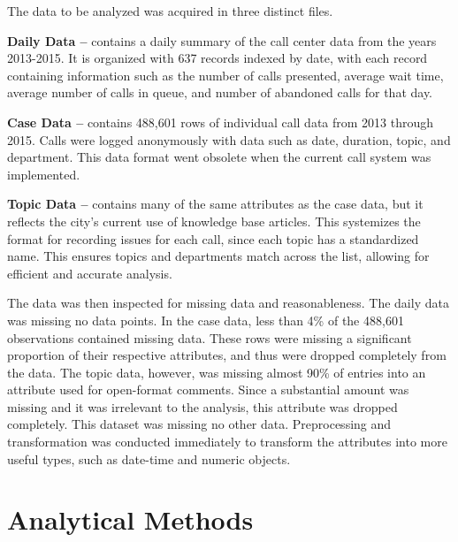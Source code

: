 \documentclass{article}
\begin{document}
The data to be analyzed was acquired in three distinct files.
\par
\textbf{Daily Data --} contains a daily summary of the call center data from the years 2013-2015.  It is organized with 637 records indexed by date, with each record containing information such as the number of calls presented, average wait time, average number of calls in queue, and number of abandoned calls for that day.
\par
\textbf{Case Data --} contains 488,601 rows of individual call data from 2013 through 2015.  Calls were logged anonymously with data such as date, duration, topic, and department.  This data format went obsolete when the current call system was implemented.
\par
\textbf{Topic Data --} contains many of the same attributes as the case data, but it reflects the city's current use of knowledge base articles.  This systemizes the format for recording issues for each call, since each topic has a standardized name.  This ensures topics and departments match across the list, allowing for efficient and accurate analysis.
\par
The data was then inspected for missing data and reasonableness.  The daily data was missing no data points.  In the case data, less than 4\% of the 488,601 observations contained missing data.  These rows were missing a significant proportion of their respective attributes, and thus were dropped completely from the data.  The topic data, however, was missing almost 90\% of entries into an attribute used for open-format comments.  Since a substantial amount was missing and it was irrelevant to the analysis, this attribute was dropped completely.  This dataset was missing no other data.  Preprocessing and transformation was conducted immediately to transform the attributes into more useful types, such as date-time and numeric objects.

\section{Analytical Methods}
\end{document}

